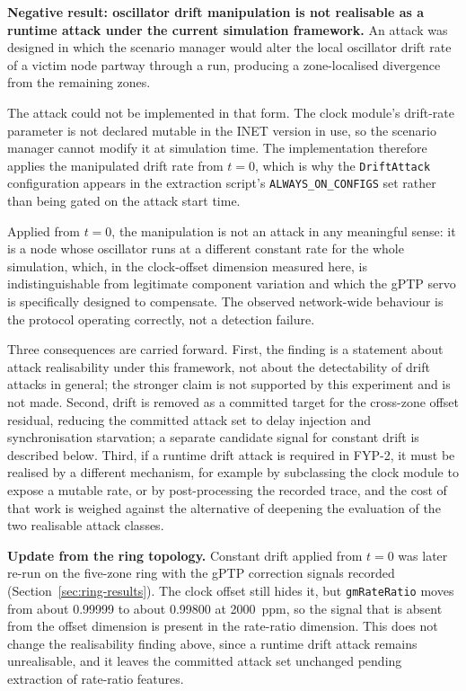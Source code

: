 \textbf{Negative result: oscillator drift manipulation is not realisable as a runtime
attack under the current simulation framework.} An attack was designed in which the
scenario manager would alter the local oscillator drift rate of a victim node partway
through a run, producing a zone-localised divergence from the remaining zones.

The attack could not be implemented in that form. The clock module's drift-rate
parameter is not declared mutable in the INET version in use, so the scenario manager
cannot modify it at simulation time. The implementation therefore applies the
manipulated drift rate from $t=0$, which is why the \texttt{DriftAttack} configuration
appears in the extraction script's \texttt{ALWAYS\_ON\_CONFIGS} set rather than being
gated on the attack start time.

Applied from $t=0$, the manipulation is not an attack in any meaningful sense: it is a
node whose oscillator runs at a different constant rate for the whole simulation, which, in the clock-offset dimension measured here, is indistinguishable from legitimate
component variation and which the gPTP servo is specifically designed to compensate. The observed network-wide behaviour is the protocol
operating correctly, not a detection failure.

Three consequences are carried forward. First, the finding is a statement about attack
realisability under this framework, not about the detectability of drift attacks in
general; the stronger claim is not supported by this experiment and is not made.
Second, drift is removed as a committed target for the cross-zone offset residual,
reducing the committed attack set to delay injection and synchronisation starvation; a
separate candidate signal for constant drift is described below. Third, if a runtime drift attack
is required in FYP-2, it must be realised by a different mechanism, for example by
subclassing the clock module to expose a mutable rate, or by post-processing the
recorded trace, and the cost of that work is weighed against the alternative of
deepening the evaluation of the two realisable attack classes.

\textbf{Update from the ring topology.} Constant drift applied from $t=0$ was later
re-run on the five-zone ring with the gPTP correction signals recorded
(Section~\ref{sec:ring-results}). The clock offset still hides it, but
\texttt{gmRateRatio} moves from about 0.99999 to about 0.99800 at 2000~ppm, so the signal
that is absent from the offset dimension is present in the rate-ratio dimension. This does
not change the realisability finding above, since a runtime drift attack remains
unrealisable, and it leaves the committed attack set unchanged pending extraction of
rate-ratio features.

